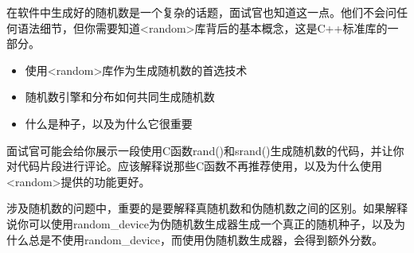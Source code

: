 
在软件中生成好的随机数是一个复杂的话题，面试官也知道这一点。他们不会问任何语法细节，但你需要知道<random>库背后的基本概念，这是C++标准库的一部分。


\begin{itemize}
\item
使用<random>库作为生成随机数的首选技术

\item
随机数引擎和分布如何共同生成随机数

\item
什么是种子，以及为什么它很重要
\end{itemize}


面试官可能会给你展示一段使用C函数rand()和srand()生成随机数的代码，并让你对代码片段进行评论。应该解释说那些C函数不再推荐使用，以及为什么使用<random>提供的功能更好。

涉及随机数的问题中，重要的是要解释真随机数和伪随机数之间的区别。如果解释说你可以使用random\_device为伪随机数生成器生成一个真正的随机种子，以及为什么总是不使用random\_device，而使用伪随机数生成器，会得到额外分数。

